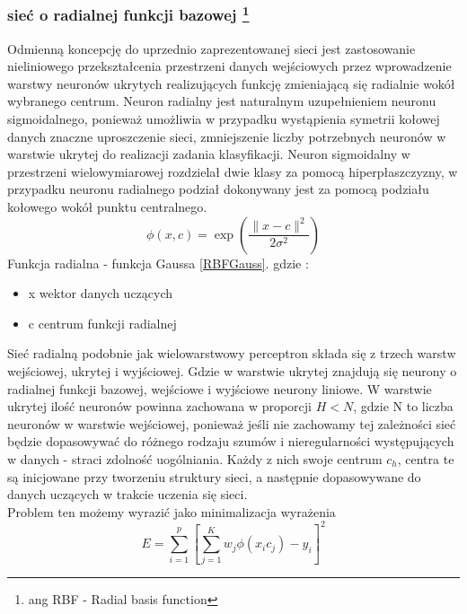 \documentclass{classrep}
\begin{document}
\subsubsection{sieć o radialnej funkcji bazowej \footnote{ang RBF - Radial basis function}}
\label{RBF}

Odmienną koncepcję do uprzednio zaprezentowanej sieci jest zastosowanie nieliniowego przekształcenia przestrzeni danych wejściowych przez wprowadzenie warstwy neuronów ukrytych realizujących funkcję zmieniającą się radialnie wokół wybranego centrum. Neuron radialny jest naturalnym uzupełnieniem neuronu sigmoidalnego, ponieważ umożliwia w przypadku wystąpienia symetrii kołowej danych znaczne uproszczenie sieci, zmniejszenie liczby potrzebnych neuronów w warstwie ukrytej do realizacji zadania klasyfikacji. Neuron sigmoidalny w przestrzeni wielowymiarowej rozdzielał dwie klasy za pomocą hiperpłaszczyzny, w przypadku neuronu radialnego podział dokonywany jest za pomocą podziału kołowego wokół punktu centralnego.
\begin{equation}
\phi (x,c) = \exp \left( \frac{\| x-c \| ^{2}}{2 \sigma ^{2}} \right)
\label{RBFGauss}
\end{equation}
Funkcja radialna - funkcja Gaussa \ref{RBFGauss}.
gdzie :
\begin{itemize}
\item x wektor danych uczących
\item c centrum funkcji radialnej
\end{itemize}

Sieć radialną podobnie jak wielowarstwowy perceptron składa się z trzech warstw wejściowej, ukrytej i wyjściowej. Gdzie w warstwie ukrytej znajdują się neurony o radialnej funkcji bazowej, wejściowe i wyjściowe neurony liniowe. W warstwie ukrytej ilość neuronów powinna zachowana w proporcji $H < N$, gdzie N to liczba neuronów w warstwie wejściowej, ponieważ jeśli nie zachowamy tej zależności sieć będzie dopasowywać do różnego rodzaju szumów i nieregularności występujących w danych - straci zdolność uogólniania. Każdy z nich swoje centrum $c_{h}$, centra te są inicjowane przy tworzeniu struktury sieci, a następnie dopasowywane do danych uczących w trakcie uczenia się sieci. \\

Problem ten możemy wyrazić jako minimalizacja wyrażenia 
\begin{equation}
E = \sum \limits ^{p} _{i=1} \left[ \sum \limits ^{K} _{j=1} w_j \phi ( x_i c_j) -y_i  \right] ^{2}
\end{equation}
\end{document}
